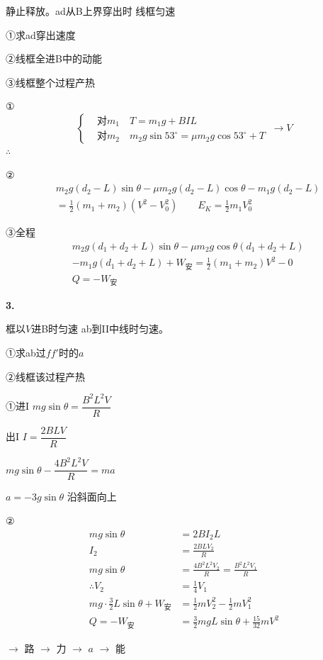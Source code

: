 \begin{problem}
静止释放。ad从B上界穿出时 线框匀速

①求ad穿出速度

②线框全进B中的动能

③线框整个过程产热
\begin{solution}
①
\[ \left\{\begin{aligned} &\text{对}m_1\quad T=m_1g+BIL\\ &\text{对}m_2\quad m_2g\sin53^\circ=\mu m_2g\cos53^\circ+T\end{aligned}\right.\ \to V \]
$\therefore$ 

②
\begin{align*}
&m_2g(d_2-L)\sin\theta-\mu m_2g(d_2-L)\cos\theta-m_1g(d_2-L)\\
&=\frac12(m_1+m_2)(V^{2}-V_0^{2})\qquad E_K=\frac12 m_1V_0^{2}
\end{align*}

③全程
\begin{align*}
&m_2g(d_1+d_2+L)\sin\theta-\mu m_2g\cos\theta(d_1+d_2+L)\\
&-m_1g(d_1+d_2+L)+W_{\text{安}}=\frac12(m_1+m_2)V^{2}-0\\
&Q=-W_{\text{安}}
\end{align*}
\end{solution}
\end{problem}
\textbf{3.}

\begin{problem}
框以$V$进B时匀速 \quad ab到II中线时匀速。

①求ab过$ff'$时的$a$

②线框该过程产热
\begin{solution}
①进I \quad $mg\sin\theta=\dfrac{B^{2}L^{2}V}{R}$

出I \quad $I=\dfrac{2BLV}{R}$

$mg\sin\theta-\dfrac{4B^{2}L^{2}V}{R}=ma$

$a=-3g\sin\theta$ 沿斜面向上

②
\begin{align*}
mg\sin\theta&=2BI_2L\\
I_2&=\frac{2BLV_2}{R}\\
mg\sin\theta&=\frac{4B^{2}L^{2}V_2}{R}=\frac{B^{2}L^{2}V_1}{R}\\
\therefore V_2&=\frac14 V_1\\
mg\cdot\frac32 L\sin\theta+W_{\text{安}}&=\frac12 mV_2^{2}-\frac12 mV_1^{2}\\
Q=-W_{\text{安}}&=\frac32 mgL\sin\theta+\frac{15}{32}mV^{2}
\end{align*}
\end{solution}
\end{problem}
$\to$ 路 $\to$ 力 $\to$ $a$ $\to$ 能

